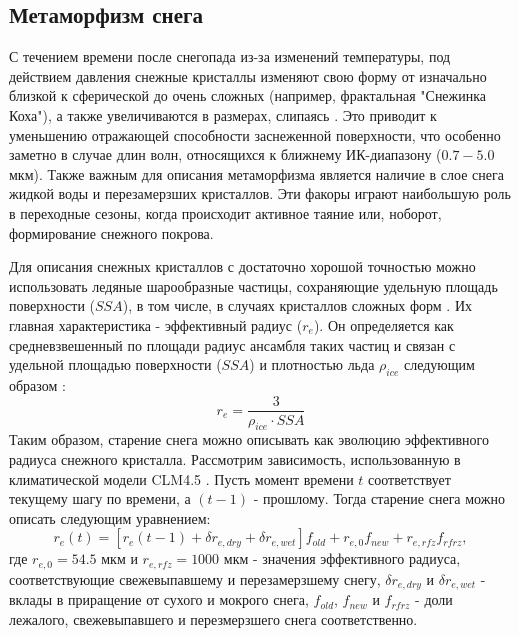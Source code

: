 \documentclass[a4paper, fontsize=14pt]{scrartcl}
\begin{document}
\subsection{Метаморфизм снега}

С течением времени после снегопада из-за изменений температуры, под действием давления снежные кристаллы изменяют свою форму от изначально близкой к сферической до очень сложных (например, фрактальная "Снежинка Коха"), а также увеличиваются в размерах, слипаясь \cite{Grenfell1999, Grenfell2005, He2018}. Это приводит к уменьшению отражающей способности заснеженной поверхности, что особенно заметно в случае длин волн, относящихся к ближнему ИК-диапазону ($0.7-5.0$ мкм). Также важным для описания метаморфизма является наличие в слое снега жидкой воды и перезамерзших кристаллов. Эти факоры играют наибольшую роль в переходные сезоны, когда происходит активное таяние или, ноборот, формирование снежного покрова.


Для описания снежных кристаллов с достаточно хорошой точностью можно использовать ледяные шарообразные частицы, сохраняющие удельную площадь поверхности ($SSA$), в том числе, в случаях кристаллов сложных форм \cite{Grenfell1999}. Их главная характеристика - эффективный радиус ($r_e$). Он определяется как средневзвешенный по площади радиус ансамбля таких частиц и связан с удельной площадью поверхности ($SSA$) и плотностью льда $\rho_{ice}$ следующим образом \cite{Flanner2006}:  
\begin{equation}
    r_e = \dfrac{3} {\rho_{ice} \cdot SSA} \label{sys}
\end{equation}
Таким образом, старение снега можно описывать как эволюцию эффективного радиуса снежного кристалла. Рассмотрим зависимость, использованную в климатической модели CLM4.5 \cite{CLM4.5tech}. Пусть момент времени $t$ соответствует текущему шагу по времени, а $(t - 1)$ - прошлому. Тогда старение снега можно описать следующим уравнением:
\begin{equation}
    r_e(t) = [r_e (t - 1) + \delta r_{e , dry} + \delta r_{e , wet} ] f_{old} + r_{e ,0} f_{new} + r_{e , rfz} f_{rfrz}, \label{sys}
\end{equation}
где $ r_{e ,0} = 54.5 $ мкм и $r_{e , rfz} = 1000 $ мкм - значения эффективного радиуса, соответствующие свежевыпавшему и перезамерзшему снегу, $\delta r_{e , dry}$ и $\delta r_{e , wet}$ - вклады в приращение от сухого и мокрого снега, $f_{old}$, $f_{new}$ и $f_{rfrz}$ - доли лежалого, свежевыпавшего и перезмерзшего снега соответственно.  
\end{document}
